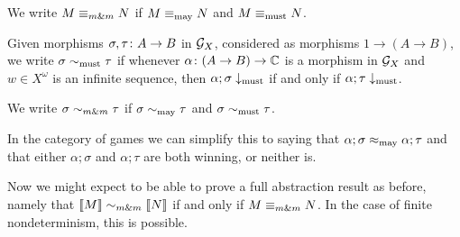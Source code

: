 \documentclass{article}
\begin{document}
We write $M\mathrel{\equiv_{m\&m}} N$ if $M\equiv_{\operatorname{may}} N$ and $M\equiv_{\operatorname{must}} N$.

\begin{definition}
  Given morphisms $\sigma,\tau\colon A \to B$ in $\mathcal G_X$, considered as morphisms $1 \to (A \to B)$, we write $\sigma\sim_{\operatorname{must}}\tau$ if whenever $\alpha\colon (A \to B) \to \mathbb{C}$ is a morphism in $\mathcal G_X$ and $w\in X^\omega$ is an infinite sequence, then $\alpha;\sigma\downarrow_{\operatorname{must}}$ if and only if $\alpha;\tau\downarrow_{\operatorname{must}}$.
\end{definition}

We write $\sigma\mathrel{\sim_{m\&m}} \tau$ if $\sigma\sim_{\operatorname{may}}\tau$ and $\sigma\sim_{\operatorname{must}} \tau$.

\begin{remark}
  In the category of games we can simplify this to saying that $\alpha;\sigma\approx_{\operatorname{may}}\alpha;\tau$ and that either $\alpha;\sigma$ and $\alpha;\tau$ are both winning, or neither is.
\end{remark}

Now we might expect to be able to prove a full abstraction result as before, namely that $\left\llbracket M\right\rrbracket\mathrel{\sim_{m\&m}} \left\llbracket N\right\rrbracket$ if and only if $M\mathrel{\equiv_{m\&m}} N$.  
In the case of finite nondeterminism, this is possible.
\end{document}
